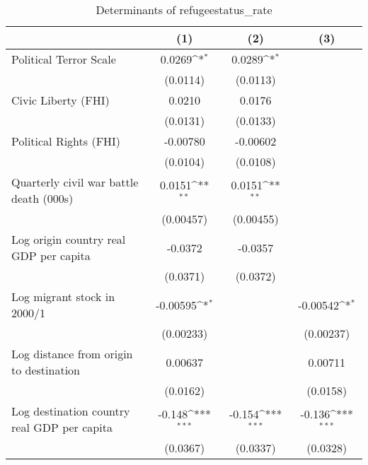 \begin{table}[htbp]\centering
\def\sym#1{\ifmmode^{#1}\else\(^{#1}\)\fi}
\caption{Determinants of refugeestatus\_rate}
\begin{tabular}{l*{3}{c}}
\hline\hline
                    &\multicolumn{1}{c}{(1)}         &\multicolumn{1}{c}{(2)}         &\multicolumn{1}{c}{(3)}         \\
\hline
Political Terror Scale&      0.0269\sym{*}  &      0.0289\sym{*}  &                     \\
                    &    (0.0114)         &    (0.0113)         &                     \\
[1em]
Civic Liberty (FHI) &      0.0210         &      0.0176         &                     \\
                    &    (0.0131)         &    (0.0133)         &                     \\
[1em]
Political Rights (FHI)&    -0.00780         &    -0.00602         &                     \\
                    &    (0.0104)         &    (0.0108)         &                     \\
[1em]
Quarterly civil war battle death (000s)&      0.0151\sym{**} &      0.0151\sym{**} &                     \\
                    &   (0.00457)         &   (0.00455)         &                     \\
[1em]
Log origin country real GDP per capita&     -0.0372         &     -0.0357         &                     \\
                    &    (0.0371)         &    (0.0372)         &                     \\
[1em]
Log migrant stock in 2000/1&    -0.00595\sym{*}  &                     &    -0.00542\sym{*}  \\
                    &   (0.00233)         &                     &   (0.00237)         \\
[1em]
Log distance from origin to destination&     0.00637         &                     &     0.00711         \\
                    &    (0.0162)         &                     &    (0.0158)         \\
[1em]
Log destination country real GDP per capita&      -0.148\sym{***}&      -0.154\sym{***}&      -0.136\sym{***}\\
                    &    (0.0367)         &    (0.0337)         &    (0.0328)         \\

\end{tabular}
\end{table}

